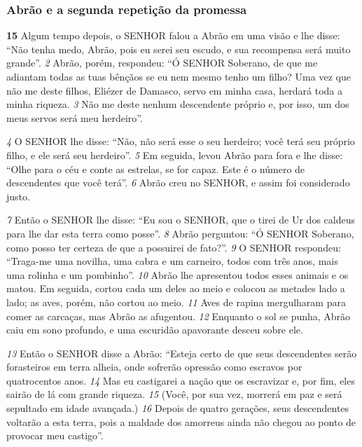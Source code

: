 \bigskip
\subsubsection*{Abrão e a segunda repetição da promessa}
\textbf{\large 15}
 Algum tempo depois, o SENHOR falou a Abrão em uma visão e lhe disse:
“Não tenha medo, Abrão, pois eu serei seu escudo, e sua recompensa será muito
grande”.
\textit{\tiny 2}
Abrão, porém, respondeu: “Ó SENHOR Soberano, de que me adiantam todas as
tuas bênçãos se eu nem mesmo tenho um filho? Uma vez que não me deste filhos,
Eliézer de Damasco, servo em minha casa, herdará toda a minha riqueza. 
\textit{\tiny 3}
Não me
deste nenhum descendente próprio e, por isso, um dos meus servos será meu
herdeiro”.

\bigskip
\textit{\tiny 4}
O SENHOR lhe disse: “Não, não será esse o seu herdeiro; você terá seu próprio
filho, e ele será seu herdeiro”. 
\textit{\tiny 5}
Em seguida, levou Abrão para fora e lhe disse:
“Olhe para o céu e conte as estrelas, se for capaz. Este é o número de
descendentes que você terá”.
\textit{\tiny 6}
Abrão creu no SENHOR, e assim foi considerado justo.

\bigskip
\textit{\tiny 7}
Então o SENHOR lhe disse: “Eu sou o SENHOR, que o tirei de Ur dos caldeus para
lhe dar esta terra como posse”.
\textit{\tiny 8}
Abrão perguntou: “Ó SENHOR Soberano, como posso ter certeza de que a
possuirei de fato?”.
\textit{\tiny 9}
O SENHOR respondeu: “Traga-me uma novilha, uma cabra e um carneiro, todos
com três anos, mais uma rolinha e um pombinho”. 
\textit{\tiny 10}
Abrão lhe apresentou todos
esses animais e os matou. Em seguida, cortou cada um deles ao meio e colocou as
metades lado a lado; as aves, porém, não cortou ao meio. 
\textit{\tiny 11}
Aves de rapina
mergulharam para comer as carcaças, mas Abrão as afugentou.
\textit{\tiny 12}
Enquanto  o sol se punha, Abrão caiu em sono profundo, e uma escuridão
apavorante desceu sobre ele. 

\bigskip
\textit{\tiny 13}
Então o SENHOR disse a Abrão: “Esteja certo de que
seus descendentes serão forasteiros em terra alheia, onde sofrerão opressão
como escravos por quatrocentos anos. 
\textit{\tiny 14}
Mas eu castigarei a nação que os
escravizar e, por fim, eles sairão de lá com grande riqueza. 
\textit{\tiny 15}
(Você, por sua vez,
morrerá em paz e será sepultado em idade avançada.) 
\textit{\tiny 16}
Depois de quatro
gerações, seus descendentes voltarão a esta terra, pois a maldade dos amorreus
ainda não chegou ao ponto de provocar meu castigo”.

